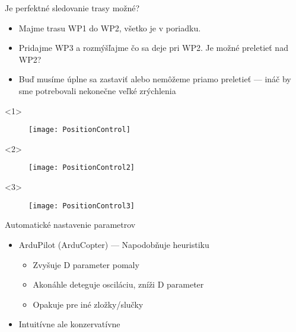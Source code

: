 \documentclass{beamer}
\begin{document}
\begin{frame}{Je perfektné sledovanie trasy možné?}
\begin{itemize}
\item<1-> Majme trasu WP1 do WP2, všetko je v poriadku.
\item<2-> Pridajme WP3 a rozmýšľajme čo sa deje pri WP2. Je možné preletieť nad WP2?
\item<3-> Buď musíme úplne sa zastaviť alebo nemôžeme priamo preletieť --- ináč by sme potrebovali nekonečne veľké zrýchlenia
\end{itemize}

\begin{onlyenv}<1>
  \begin{figure}
\centering
  \texttt{[image: PositionControl]}\\
\end{figure}
\end{onlyenv}

\begin{onlyenv}<2>
  \begin{figure}
\centering
  \texttt{[image: PositionControl2]}\\
\end{figure}
\end{onlyenv}

\begin{onlyenv}<3>
  \begin{figure}
\centering
  \texttt{[image: PositionControl3]}\\
\end{figure}
\end{onlyenv}


\end{frame}


\begin{frame}[t]{Automatické nastavenie parametrov}
\begin{itemize}
  \item ArduPilot (ArduCopter) --- Napodobňuje heuristiku \citep{AP:LogSeminar}
  \begin{itemize}
  \item Zvyšuje D parameter pomaly
  \item Akonáhle deteguje osciláciu, zníži D parameter
  \item Opakuje pre iné zložky/slučky
\end{itemize}
\item Intuitívne ale konzervatívne
\end{itemize}

\end{frame}
\end{document}
